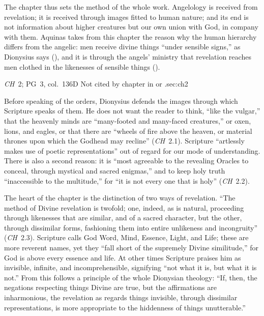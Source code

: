 The chapter thus sets the method of the whole work. Angelology is
received from revelation; it is received through images fitted to human
nature; and its end is not information about higher creatures but our
own union with God, in company with them. Aquinas takes from this
chapter the reason why the human hierarchy differs from the angelic:
men receive divine things ``under sensible signs,'' as Dionysius says
(), and it is through the angels' ministry that
revelation reaches men clothed in the likenesses of sensible things
().

{\emph{CH}~2; PG~3, col.~136D}
{Not cited by chapter in  or .}{sec:ch2}

Before speaking of the orders, Dionysius defends the images through
which Scripture speaks of them. He does not want the reader to think,
``like the vulgar,'' that the heavenly minds are ``many-footed and
many-faced creatures,'' or oxen, lions, and eagles, or that there are
``wheels of fire above the heaven, or material thrones upon which the
Godhead may recline'' (\emph{CH}~2.1). Scripture ``artlessly makes use
of poetic representations'' out of regard for our mode of understanding.
There is also a second reason: it is ``most agreeable to the revealing
Oracles to conceal, through mystical and sacred enigmas,'' and to keep
holy truth ``inaccessible to the multitude,'' for ``it is not every one
that is holy'' (\emph{CH}~2.2).

The heart of the chapter is the distinction of two ways of revelation.
``The method of Divine revelation is twofold; one, indeed, as is natural,
proceeding through likenesses that are similar, and of a sacred
character, but the other, through dissimilar forms, fashioning them into
entire unlikeness and incongruity'' (\emph{CH}~2.3). Scripture calls God
Word, Mind, Essence, Light, and Life; these are more reverent names, yet
they ``fall short of the supremely Divine similitude,'' for God is above
every essence and life. At other times Scripture praises him as
invisible, infinite, and incomprehensible, signifying ``not what it is,
but what it is not.'' From this follows a principle of the whole
Dionysian theology: ``If, then, the negations respecting things Divine
are true, but the affirmations are inharmonious, the revelation as
regards things invisible, through dissimilar representations, is more
appropriate to the hiddenness of things unutterable.''

